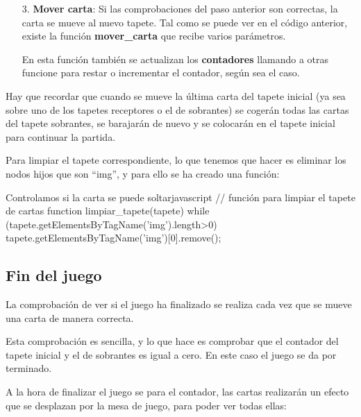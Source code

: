 \documentclass{\ClassPath/viu-tfm-template}
\begin{document}
\vspace{-1em}
\begin{enumerate}
    \item[3.] \textbf{Mover carta}: Si las comprobaciones del paso anterior son correctas, la carta se mueve al nuevo tapete. Tal como se puede ver en el código anterior, existe la función \textbf{mover\_carta} que recibe varios parámetros.

    En esta función también se actualizan los \textbf{contadores} llamando a otras funcione para restar o incrementar el contador, según sea el caso.
\end{enumerate}
\vspace{-1em}

Hay que recordar que cuando se mueve la última carta del tapete inicial (ya sea sobre uno de los tapetes receptores o el de sobrantes) se cogerán todas las cartas del tapete sobrantes, se barajarán de nuevo y se colocarán en el tapete inicial para continuar la partida.

Para limpiar el tapete correspondiente, lo que tenemos que hacer es eliminar los nodos hijos que son “img”, y para ello se ha creado una función:
\begin{mycode}{Controlamos si la carta se puede soltar}{javascript}{}
// función para limpiar el tapete de cartas
function limpiar_tapete(tapete) {
    while (tapete.getElementsByTagName('img').length>0) {
        tapete.getElementsByTagName('img')[0].remove();
    }
}
\end{mycode}



\subsection{Fin del juego}
La comprobación de ver si el juego ha finalizado se realiza cada vez que se mueve una carta de manera correcta.

Esta comprobación es sencilla, y lo que hace es comprobar que el contador del tapete inicial y el de sobrantes es igual a cero. En este caso el juego se da por terminado.

A la hora de finalizar el juego se para el contador, las cartas realizarán un efecto que se desplazan por la mesa de juego, para poder ver todas ellas:
\end{document}
